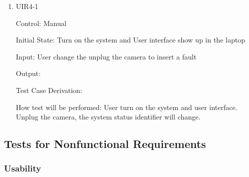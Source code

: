 \documentclass[12pt, titlepage]{article}
\begin{document}
\begin{enumerate}
\item{UIR4-1\\}

Control: Manual
					
Initial State: Turn on the system and User interface show up in the laptop
					
Input: User change the unplug the camera to insert a fault
					
Output: 

Test Case Derivation: 
					
How test will be performed: 
	User turn on the system and user interface. Unplug the camera, the system status identifier will change.
\end{enumerate}

\subsection{Tests for Nonfunctional Requirements}




\subsubsection{Usability}
		
\end{document}
